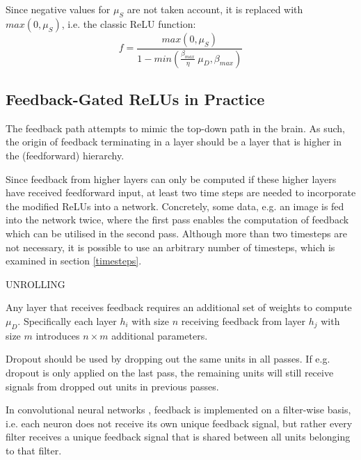 \documentclass{article}
\begin{document}
Since negative values for $\mu_S$ are not taken account, it is replaced with $max(0, \mu_S)$, i.e. the classic ReLU function: 
\begin{equation}
\label{eq:fgrelu}
		f = \frac{max(0, \mu_S)}{1 - min(\frac{\beta_{max}}{\eta} \ \mu_D, \beta_{max})} 
\end{equation}

\subsection{Feedback-Gated ReLUs in Practice}
\label{inpractice}
The feedback path attempts to mimic the top-down path in the brain. As such, the origin of feedback terminating in a layer should be a layer that is higher in the (feedforward) hierarchy. 

Since feedback from higher layers can only be computed if these higher layers have received feedforward input, at least two time steps are needed to incorporate the modified ReLUs into a network. Concretely, some data, e.g. an image is fed into the network twice, where the first pass enables the computation of feedback which can be utilised in the second pass. 
	Although more than two timesteps are not necessary, it is possible to use an arbitrary number of timesteps, which is examined in section \ref{timesteps}.
	
	UNROLLING 
	
Any layer that receives feedback requires an additional set of weights to compute $\mu_D$. Specifically each layer $h_i$ with size $n$ receiving feedback from layer $h_j$ with size $m$ introduces $n \times m$ additional parameters.  
	
Dropout \cite{srivastava2014dropout} should be used by dropping out the same units in all passes.  
If e.g. dropout is only applied on the last pass, the remaining units will still receive signals from dropped out units in previous passes.

In convolutional neural networks \cite{lecun1989generalization}, feedback is implemented on a filter-wise basis, i.e. each neuron does not receive its own unique feedback signal, but rather every filter receives a unique feedback signal that is shared between all units belonging to that filter. 
\end{document}
